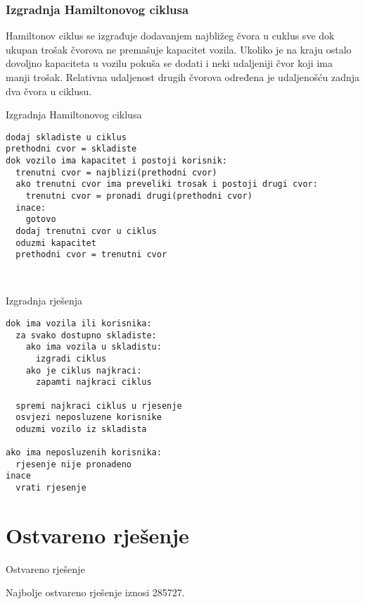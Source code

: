 \documentclass[utf8]{beamer}
\begin{document}
\begin{frame}
\frametitle{Izgradnja Hamiltonovog ciklusa}
Hamiltonov ciklus se izgrađuje dodavanjem najbližeg čvora u cuklus sve dok ukupan trošak čvorova ne premašuje kapacitet vozila. Ukoliko je na kraju ostalo dovoljno kapaciteta u vozilu pokuša se dodati i neki udaljeniji čvor koji ima manji trošak. Relativna udaljenost drugih čvorova određena je udaljenošću zadnja dva čvora u ciklusu.
\end{frame}

\begin{frame}[fragile]{Izgradnja Hamiltonovog ciklusa}
\begin{lstlisting}
dodaj skladiste u ciklus
prethodni cvor = skladiste
dok vozilo ima kapacitet i postoji korisnik:
  trenutni cvor = najblizi(prethodni cvor)  
  ako trenutni cvor ima preveliki trosak i postoji drugi cvor:
    trenutni cvor = pronadi drugi(prethodni cvor)
  inace:
    gotovo
  dodaj trenutni cvor u ciklus
  oduzmi kapacitet
  prethodni cvor = trenutni cvor
  
  
\end{lstlisting}
\end{frame}

\begin{frame}[fragile]{Izgradnja rješenja}
\begin{lstlisting}
dok ima vozila ili korisnika:
  za svako dostupno skladiste:
    ako ima vozila u skladistu:
      izgradi ciklus
    ako je ciklus najkraci:
      zapamti najkraci ciklus

  spremi najkraci ciklus u rjesenje
  osvjezi neposluzene korisnike
  oduzmi vozilo iz skladista

ako ima neposluzenih korisnika:
  rjesenje nije pronadeno
inace
  vrati rjesenje

\end{lstlisting}
\end{frame}

\section{Ostvareno rješenje}
\begin{frame}{Ostvareno rješenje}

Najbolje ostvareno rješenje iznosi 285727.

\end{frame}
\end{document}

